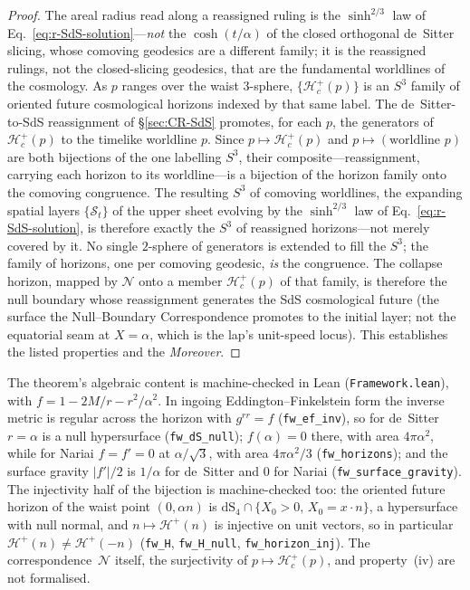 \documentclass[11pt,a4paper]{article}
\theoremstyle{plain}
\theoremstyle{definition}
\theoremstyle{remark}
\begin{document}
\begin{proof}
The areal radius read along a reassigned ruling is the $\sinh^{2/3}$ law of Eq.~\eqref{eq:r-SdS-solution}---\emph{not} the $\cosh(t/\alpha)$ of the closed orthogonal de~Sitter slicing, whose comoving geodesics are a different family; it is the reassigned rulings, not the closed-slicing geodesics, that are the fundamental worldlines of the cosmology. As $p$ ranges over the waist $3$-sphere, $\{\mathcal{H}_c^{+}(p)\}$ is an $S^3$ family of oriented future cosmological horizons indexed by that same label. The de~Sitter-to-SdS reassignment of \S\ref{sec:CR-SdS} promotes, for each $p$, the generators of $\mathcal{H}_c^{+}(p)$ to the timelike worldline $p$. Since $p\mapsto\mathcal{H}_c^{+}(p)$ and $p\mapsto(\text{worldline }p)$ are both bijections of the one labelling $S^3$, their composite---reassignment, carrying each horizon to its worldline---is a bijection of the horizon family onto the comoving congruence. The resulting $S^3$ of comoving worldlines, the expanding spatial layers $\{\mathcal{S}_t\}$ of the upper sheet evolving by the $\sinh^{2/3}$ law of Eq.~\eqref{eq:r-SdS-solution}, is therefore exactly the $S^3$ of reassigned horizons---not merely covered by it. No single $2$-sphere of generators is extended to fill the $S^3$; the family of horizons, one per comoving geodesic, \emph{is} the congruence. The collapse horizon, mapped by $\mathcal{N}$ onto a member $\mathcal{H}_c^{+}(p)$ of that family, is therefore the null boundary whose reassignment generates the SdS cosmological future (the surface the Null--Boundary Correspondence promotes to the initial layer; not the equatorial seam at $X=\alpha$, which is the lap's unit-speed locus). This establishes the listed properties and the \emph{Moreover}.
\end{proof}

\noindent The theorem's algebraic content is machine-checked in Lean (\texttt{Framework.lean}), with $f=1-2M/r-r^{2}/\alpha^{2}$. In ingoing Eddington--Finkelstein form the inverse metric is regular across the horizon with $g^{rr}=f$ (\texttt{fw\_ef\_inv}), so for de~Sitter $r=\alpha$ is a null hypersurface (\texttt{fw\_dS\_null}); $f(\alpha)=0$ there, with area $4\pi\alpha^{2}$, while for Nariai $f=f'=0$ at $\alpha/\sqrt3$, with area $4\pi\alpha^{2}/3$ (\texttt{fw\_horizons}); and the surface gravity $|f'|/2$ is $1/\alpha$ for de~Sitter and $0$ for Nariai (\texttt{fw\_surface\_gravity}). The injectivity half of the bijection is machine-checked too: the oriented future horizon of the waist point $(0,\alpha n)$ is $\mathrm{dS}_4\cap\{X_0>0,\,X_0=x\cdot n\}$, a hypersurface with null normal, and $n\mapsto\mathcal{H}^{+}(n)$ is injective on unit vectors, so in particular $\mathcal{H}^{+}(n)\neq\mathcal{H}^{+}(-n)$ (\texttt{fw\_H}, \texttt{fw\_H\_null}, \texttt{fw\_horizon\_inj}). The correspondence~$\mathcal{N}$ itself, the surjectivity of $p\mapsto\mathcal{H}_c^{+}(p)$, and property~(iv) are not formalised.
\end{document}
